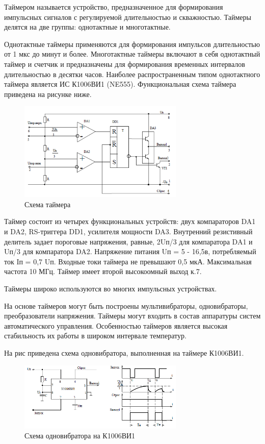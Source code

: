 \documentclass[unicode, 12pt, a4paper, oneside]{article}
\begin{document}
Таймером называется устройство, предназначенное для формирования импульсных сигналов с регулируемой длительностью и скважностью. Таймеры делятся на две группы: однотактные и многотактные.

Однотактные таймеры применяются для формирования импульсов длительностью от 1 мкс до минут  и более. Многотактные таймеры включают в себя однотактный таймер и счетчик и предназначены для формирования временных интервалов длительностью в десятки часов.
Наиболее распространенным типом однотактного таймера является ИС К1006ВИ1 (NE555). Функциональная схема таймера приведена на рисунке ниже.

\begin{figure}[H]
\centering
\includegraphics[width=0.7\textwidth]{18_scheme.png}
\caption{Схема таймера}
\label{fig:18_scheme_2INT}
\end{figure}

Таймер состоит из четырех функциональных устройств: двух компараторов DA1 и DA2,  RS-триггера  DD1, усилителя мощности DA3. Внутренний резистивный делитель задает пороговые напряжения, равные, 2Uп/3 для компаратора DA1 и Uп/3 для компаратора DA2. Напряжение питания Uп = 5 - 16,5в, потребляемый ток Iп = 0,7 Uп. Входные токи таймера не превышают 0,5 мкА. Максимальная частота 10 МГц. Таймер имеет второй высокоомный выход к.7.

Таймеры широко используются во многих импульсных устройствах.

На основе таймеров могут быть построены мультивибраторы, одновибраторы, преобразователи напряжения. Таймеры могут входить в состав аппаратуры систем автоматического управления. Особенностью таймеров является высокая стабильность их работы в широком интервале температур.

На рис приведена схема одновибратора, выполненная на таймере К1006ВИ1.

\begin{figure}[H]
\centering
\includegraphics[width=0.7\textwidth]{18_diag.png}
\caption{Схема одновибратора на К1006ВИ1}
\label{fig:18_diag}
\end{figure}
\end{document}
